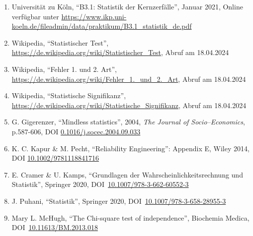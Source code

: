 \documentclass[12pt,a4paper]{scrartcl}
\numberwithin{equation}{section} %
\renewcommand{\[}{} %
\renewcommand{\]}{\noindent} %
\newcommand{\tightlist}{} %
\begin{document}
\begin{enumerate}
\def\labelenumi{\arabic{enumi}.}
\tightlist
\item
  Universität zu Köln, ``B3.1: Statistik der Kernzerfälle'', Januar
  2021, Online verfügbar unter
  \url{https://www.ikp.uni-koeln.de/fileadmin/data/praktikum/B3.1_statistik_de.pdf}
\item
  Wikipedia, ``Statistischer Test'',
  \url{https://de.wikipedia.org/wiki/Statistischer_Test}, Abruf am
  18.04.2024
\item
  Wikipedia, ``Fehler 1. und 2. Art'',
  \url{https://de.wikipedia.org/wiki/Fehler_1._und_2._Art}, Abruf am
  18.04.2024
\item
  Wikipedia, ``Statistische Signifikanz'',
  \url{https://de.wikipedia.org/wiki/Statistische_Signifikanz}, Abruf am
  18.04.2024
\item
  G. Gigerenzer, ``Mindless statistics'', 2004, \emph{The Journal of
  Socio--Economics}, p.587-606, DOI
  \href{https://doi.org/10.1016/j.socec.2004.09.033}{0.1016/j.socec.2004.09.033}
\item
  K. C. Kapur \& M. Pecht, ``Reliability Engineering'': Appendix E,
  Wiley 2014, DOI
  \href{https://doi.org/10.1002/9781118841716}{10.1002/9781118841716}
\item
  E. Cramer \& U. Kamps, ``Grundlagen der Wahrscheinlichkeitsrechnung
  und Statistik'', Springer 2020, DOI~\href{https://doi.org/10.1007/978-3-662-60552-3}{10.1007/978-3-662-60552-3}
\item
  J. Puhani, ``Statistik'', Springer 2020, DOI~\href{https://doi.org/10.1007/978-3-658-28955-3}{10.1007/978-3-658-28955-3}
\item
 Mary L. McHugh, ``The Chi-square test of independence'', Biochemia Medica, DOI~\href{https://doi.org/10.11613/BM.2013.018}{10.11613/BM.2013.018}
\end{enumerate}
\end{document}

